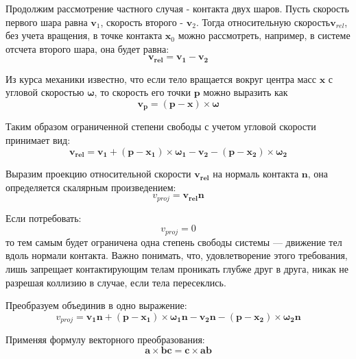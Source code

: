 Продолжим рассмотрение частного случая - контакта двух шаров. Пусть скорость первого шара равна $\mathbf{v}_1$, скорость второго - $\mathbf{v}_2$.
Тогда относительную скорость$\mathbf{v}_{rel}$, без учета вращения, в точке контакта $\mathbf{x}_0$  можно рассмотреть, например, в системе отсчета второго шара,
она будет равна:
\begin{equation}
\mathbf{v_{rel}} = \mathbf{v_1} - \mathbf{v_2}
\end{equation}

Из курса механики известно, что если тело вращается вокруг центра масс $\mathbf{x}$  с угловой скоростью $\mathbf{\omega}$,
то скорость его точки $\mathbf{p}$ можно выразить как
\begin{equation}
\mathbf{v_p} = (\mathbf{p} - \mathbf{x}) \times \mathbf{\omega} 
\end{equation}

Таким образом ограниченной степени свободы с учетом угловой скорости принимает вид:
\begin{equation}
\mathbf{v_{rel}} = \mathbf{v_1} + (\mathbf{p} - \mathbf{x_1}) \times \mathbf{\omega_{1}} -  \mathbf{v_2} - (\mathbf{p} - \mathbf{x_2}) \times \mathbf{\omega_{2}}
\end{equation}

Выразим проекцию относительной скорости $\mathbf{v_{rel}}$ на нормаль контакта $\mathbf{n}$, она определяется скалярным произведением:
\begin{equation}
v_{proj} = \mathbf{v_{rel}} \mathbf{n}
\end{equation}

Если потребовать: 
\begin{equation}
v_{proj} = 0
\end{equation}
то тем самым будет ограничена одна степень свободы системы --- движение тел вдоль нормали контакта. Важно понимать,
что, удовлетворение этого требования, лишь запрещает контактирующим телам проникать глубже друг в друга, никак не разрешая коллизию в случае,
если тела пересеклись.

Преобразуем объединив в одно выражение:
\begin{equation}
    v_{proj} = \mathbf{v_1} \mathbf{n} + (\mathbf{p} - \mathbf{x_1}) \times \mathbf{\omega_{1}} \mathbf{n} 
    -  \mathbf{v_2} \mathbf{n} - (\mathbf{p} - \mathbf{x_2}) \times \mathbf{\omega_{2}} \mathbf{n}
\end{equation}

Применяя формулу векторного преобразования:
\begin{equation}
\mathbf{a} \times \mathbf{b} \mathbf{c} = \mathbf{c} \times \mathbf{a} \mathbf{b} 
\end{equation}

